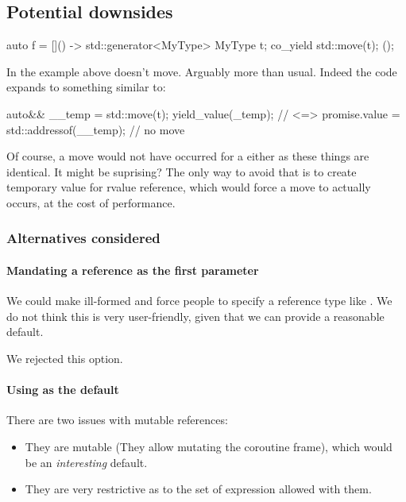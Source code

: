 \documentclass{wg21}
\begin{document}
\subsection{Potential downsides}
\begin{colorblock}
auto f = []() -> std::generator<MyType> {
    MyType t;
    co_yield std::move(t);
}();
\end{colorblock}

In the example above  doesn't move. Arguably more than usual.
Indeed the code expands to something similar to:

\begin{colorblock}
auto&& __temp = std::move(t);
yield_value(_temp); // <=> promise.value = std::addressof(__temp); // no move
\end{colorblock}

Of course, a move would not have occurred for a  either as these things are identical.
It might be suprising?
The only way to avoid that is to create temporary value for rvalue reference, which would force a move to actually occurs,
at the cost of performance.

\subsubsection{Alternatives considered}

\paragraph{Mandating a reference as the first parameter}

We could make  ill-formed and force people to specify a reference type like .
We do not think this is very user-friendly, given that we can provide a reasonable default.

We rejected this option.

\paragraph{Using  as the default}

There are two issues with mutable references:
\begin{itemize}
\item They are mutable (They allow mutating the coroutine frame), which would be an \emph{interesting} default.
\item They are very restrictive as to the set of  expression allowed with them.
\end{itemize}
\end{document}
